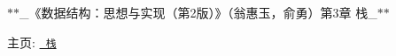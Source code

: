 $\ast$$\ast$\+\_\+《数据结构：思想与实现（第2版）》（翁惠玉，俞勇）第3章 栈\+\_\+$\ast$$\ast$

主页\+: \href{https://grwei.github.io/data-structure-homework/DS_Ch3/doc/html/index.html}{\texttt{ 栈}} 